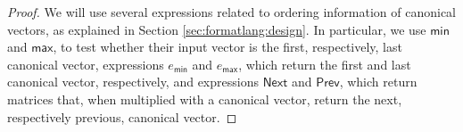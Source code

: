 \begin{proof}
    We will use several expressions related to ordering information of canonical vectors, as explained in Section \ref{sec:formatlang:design}.
	In particular, we use $\mathsf{min}$ and $\mathsf{max}$, to test whether their input vector is the first, respectively, last canonical
	vector, expressions $e_{\mathsf{min}}$ and $e_{\mathsf{max}}$, which return the first and last canonical vector, respectively, and expressions $\mathsf{Next}$
	and $\mathsf{Prev}$, which return matrices that, when multiplied with a canonical vector, return the next, respectively previous, canonical vector.

\end{proof}
